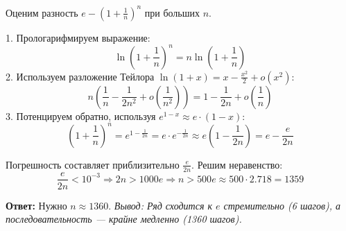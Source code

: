 \begin{tcolorbox}[title=4. Какое $n$ нужно для последовательности для точности $10^{-3}$?]
	Оценим разность $e - (1+\frac{1}{n})^n$ при больших $n$.
	
	1. Прологарифмируем выражение:
	\[ \ln \left(1+\frac{1}{n}\right)^n = n \ln \left(1+\frac{1}{n}\right) \]
	2. Используем разложение Тейлора $\ln(1+x) = x - \frac{x^2}{2} + o(x^2)$:
	\[ n \left( \frac{1}{n} - \frac{1}{2n^2} + o\left(\frac{1}{n^2}\right) \right) = 1 - \frac{1}{2n} + o\left(\frac{1}{n}\right) \]
	3. Потенцируем обратно, используя $e^{1-x} \approx e \cdot (1-x)$:
	\[ \left(1+\frac{1}{n}\right)^n = e^{1 - \frac{1}{2n}} = e \cdot e^{-\frac{1}{2n}} \approx e \left(1 - \frac{1}{2n}\right) = e - \frac{e}{2n} \]
	
	Погрешность составляет приблизительно $\frac{e}{2n}$. Решим неравенство:
	\[ \frac{e}{2n} < 10^{-3} \Rightarrow 2n > 1000e \Rightarrow n > 500e \approx 500 \cdot 2.718 = 1359 \]
	
	\textbf{Ответ:} Нужно $n \approx 1360$.
	\textit{Вывод: Ряд сходится к $e$ стремительно (6 шагов), а последовательность — крайне медленно (1360 шагов).}
\end{tcolorbox}



